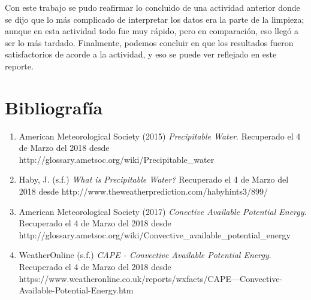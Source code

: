 \documentclass[a4paper]{article}
\begin{document}
Con este trabajo se pudo reafirmar lo concluido de una actividad anterior donde se dijo que lo más complicado de interpretar los datos era la parte de la limpieza; aunque en esta actividad todo fue muy rápido, pero en comparación, eso llegó a ser lo más tardado. Finalmente, podemos concluir en que los resultados fueron satisfactorios de acorde a la actividad, y eso se puede ver reflejado en este reporte.

\section{Bibliografía}
\begin{enumerate}
\item American Meteorological Society (2015) \textit{Precipitable Water}. Recuperado el 4 de Marzo del 2018 desde http://glossary.ametsoc.org/wiki/Precipitable\_water

\item Haby, J. (s.f.) \textit{What is Precipitable Water?} Recuperado el 4 de Marzo del 2018 desde http://www.theweatherprediction.com/habyhints3/899/

\item American Meteorological Society (2017) \textit{Conective Available Potential Energy}. Recuperado el 4 de Marzo del 2018 desde http://glossary.ametsoc.org/wiki/Convective\_available\_potential\_energy

\item WeatherOnline (s.f.) \textit{CAPE - Convective Available Potential Energy}. Recuperado el 4 de Marzo del 2018 desde https://www.weatheronline.co.uk/reports/wxfacts/CAPE---Convective-Available-Potential-Energy.htm
\end{enumerate}
\end{document}
